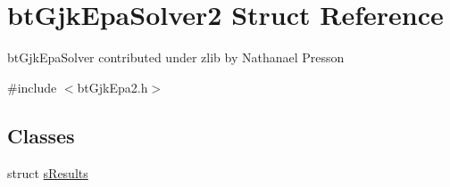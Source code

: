 \hypertarget{structbtGjkEpaSolver2}{}\section{bt\+Gjk\+Epa\+Solver2 Struct Reference}
\label{structbtGjkEpaSolver2}


bt\+Gjk\+Epa\+Solver contributed under zlib by Nathanael Presson  




{\ttfamily \#include $<$bt\+Gjk\+Epa2.\+h$>$}

\subsection*{Classes}
\begin{DoxyCompactItemize}
\item 
struct \hyperlink{structbtGjkEpaSolver2_1_1sResults}{s\+Results}
\end{DoxyCompactItemize}
